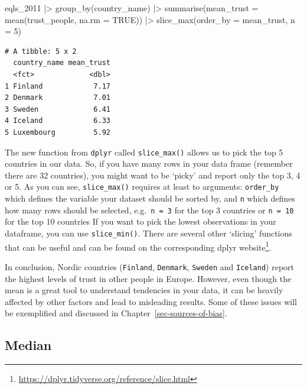 \documentclass[
  letterpaper,
]{krantz}
\makeatletter
\newenvironment{Shaded}{\begin{snugshade}}{\end{snugshade}}
\newcommand{\AttributeTok}[1]{\textcolor[rgb]{0.40,0.45,0.13}{#1}}
\newcommand{\ConstantTok}[1]{\textcolor[rgb]{0.56,0.35,0.01}{#1}}
\newcommand{\DecValTok}[1]{\textcolor[rgb]{0.68,0.00,0.00}{#1}}
\newcommand{\FunctionTok}[1]{\textcolor[rgb]{0.28,0.35,0.67}{#1}}
\newcommand{\NormalTok}[1]{\textcolor[rgb]{0.00,0.23,0.31}{#1}}
\newcommand{\SpecialCharTok}[1]{\textcolor[rgb]{0.37,0.37,0.37}{#1}}
\renewcommand{\href}[2]{#2\footnote{\url{#1}}}
\newenvironment{kframe}{%
\medskip{}
\setlength{\fboxsep}{.8em}
 \def\at@end@of@kframe{}%
 \ifinner\ifhmode%
  \def\at@end@of@kframe{\end{minipage}}%
  \begin{minipage}{\columnwidth}%
 \fi\fi%
 \def\FrameCommand##1{\hskip\@totalleftmargin \hskip-\fboxsep
 \colorbox{shadecolor}{##1}\hskip-\fboxsep
     \hskip-\linewidth \hskip-\@totalleftmargin \hskip\columnwidth}%
 \MakeFramed {\advance\hsize-\width
   \@totalleftmargin\z@ \linewidth\hsize
   \@setminipage}}%
 {\par\unskip\endMakeFramed%
 \at@end@of@kframe}
\renewenvironment{Shaded}{\begin{kframe}}{\end{kframe}}
\makeatother
\begin{document}
\begin{Shaded}
\begin{Highlighting}[]
\NormalTok{eqls\_2011 }\SpecialCharTok{|\textgreater{}}
  \FunctionTok{group\_by}\NormalTok{(country\_name) }\SpecialCharTok{|\textgreater{}}
  \FunctionTok{summarise}\NormalTok{(}\AttributeTok{mean\_trust =} \FunctionTok{mean}\NormalTok{(trust\_people, }\AttributeTok{na.rm =} \ConstantTok{TRUE}\NormalTok{)) }\SpecialCharTok{|\textgreater{}}
  \FunctionTok{slice\_max}\NormalTok{(}\AttributeTok{order\_by =}\NormalTok{ mean\_trust,}
            \AttributeTok{n =} \DecValTok{5}\NormalTok{)}
\end{Highlighting}
\end{Shaded}

\begin{verbatim}
# A tibble: 5 x 2
  country_name mean_trust
  <fct>             <dbl>
1 Finland            7.17
2 Denmark            7.01
3 Sweden             6.41
4 Iceland            6.33
5 Luxembourg         5.92
\end{verbatim}

The new function from \texttt{dplyr} called \texttt{slice\_max()} allows
us to pick the top 5 countries in our data. So, if you have many rows in
your data frame (remember there are 32 countries), you might want to be
`picky' and report only the top 3, 4 or 5. As you can see,
\texttt{slice\_max()} requires at least to arguments: \texttt{order\_by}
which defines the variable your dataset should be sorted by, and
\texttt{n} which defines how many rows should be selected,
e.g.~\texttt{n\ =\ 3} for the top 3 countries or \texttt{n\ =\ 10} for
the top 10 countries If you want to pick the lowest observations in your
dataframe, you can use \texttt{slice\_min()}. There are several other
`slicing' functions that can be useful and can be found on the
corresponding
\href{https://dplyr.tidyverse.org/reference/slice.html}{dplyr website}.

In conclusion, Nordic countries (\texttt{Finland}, \texttt{Denmark},
\texttt{Sweden} and \texttt{Iceland}) report the highest levels of trust
in other people in Europe. However, even though the mean is a great tool
to understand tendencies in your data, it can be heavily affected by
other factors and lead to misleading results. Some of these issues will
be exemplified and discussed in Chapter~\ref{sec-sources-of-bias}.

\subsection{Median}\label{sec-median}
\end{document}
